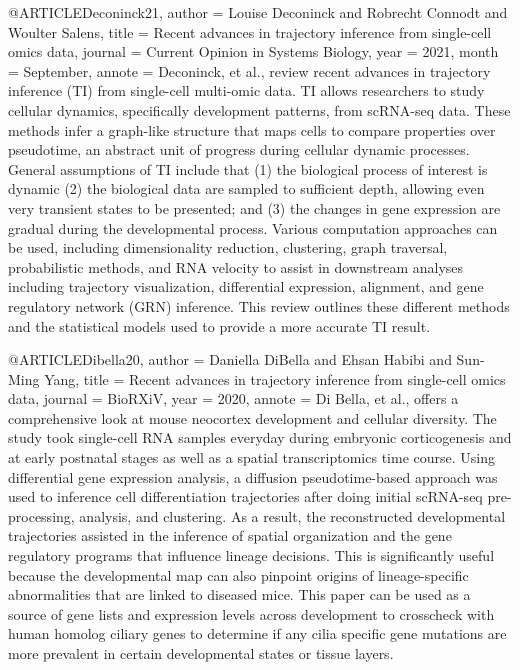  @ARTICLE{Deconinck21,
  author    = {Louise Deconinck and Robrecht Connodt and Woulter Salens},
  title     = {Recent advances in trajectory inference from single-cell omics data},
  journal   = {Current Opinion in Systems Biology},
  year      = {2021},
  month     = {September},
  annote    = {Deconinck, et al., review recent advances in trajectory inference (TI) from single-cell multi-omic data. TI allows researchers to study cellular dynamics, specifically development patterns, from scRNA-seq data. These methods infer a graph-like structure that maps cells to compare properties over pseudotime, an abstract unit of progress during cellular dynamic processes. General assumptions of TI include that (1) the biological process of interest is dynamic (2) the biological data are sampled to sufficient depth, allowing even very transient states to be presented; and (3) the changes in gene expression are gradual during the developmental process. Various computation approaches can be used, including dimensionality reduction, clustering, graph traversal, probabilistic methods, and RNA velocity to assist in downstream analyses including trajectory visualization, differential expression, alignment, and gene regulatory network (GRN) inference. This review outlines these different methods and the statistical models used to provide a more accurate TI result.
}
}

 @ARTICLE{Dibella20,
  author    = {Daniella DiBella and Ehsan Habibi and Sun-Ming Yang},
  title     = {Recent advances in trajectory inference from single-cell omics data},
  journal   = {BioRXiV},
  year      = {2020},
  annote    = {Di Bella, et al., offers a comprehensive look at mouse neocortex development and cellular diversity. The study took single-cell RNA samples everyday during embryonic corticogenesis and at early postnatal stages as well as a spatial transcriptomics time course. Using differential gene expression analysis, a diffusion pseudotime-based approach was used to inference cell differentiation trajectories after doing initial scRNA-seq pre-processing, analysis, and clustering. As a result, the reconstructed developmental trajectories assisted in the inference of spatial organization and the gene regulatory programs that influence lineage decisions. This is significantly useful because the developmental map can also pinpoint origins of lineage-specific abnormalities that are linked to diseased mice. This paper can be used as a source of gene lists and expression levels across development to crosscheck with human homolog ciliary genes to determine if any cilia specific gene mutations are more prevalent in certain developmental states or tissue layers. 
}
}

